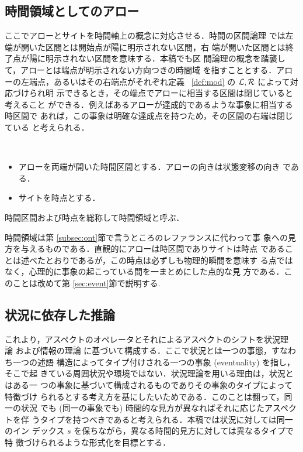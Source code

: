 \subsection{時間領域としてのアロー}\label{subsec:ato}


ここでアローとサイトを時間軸上の概念に対応させる．時間の区間論理 
\cite{Dowty79} では左端が開いた区間とは開始点が陽に明示されない区間，右
端が開いた区間とは終了点が陽に明示されない区間を意味する．本稿でも区
間論理の概念を踏襲して，アローとは端点が明示されない方向つきの時間域
を指すこととする．アローの左端点，あるいはその右端点がそれぞれ定義~
\ref{def:mod} の ${\cal L}, {\cal R}$ によって対応づけられ明
示できるとき，その端点でアローに相当する区間は閉じていると考えること
ができる．例えばあるアローが達成的であるような事象に相当する時区間で
あれば，この事象は明確な達成点を持つため，その区間の右端は閉じている
と考えられる．

\begin{my-spec}[時間領域]\label{spec:dir}~
\begin{itemize}
\item アローを両端が開いた時間区間とする．アローの向きは状態変移の向き
である．
\item サイトを時点とする．
\end{itemize}
時間区間および時点を総称して時間領域と呼ぶ．
\end{my-spec}
時間領域は第 \ref{subsec:ont}節で言うところのレファランスに代わって事
象への見方を与えるものである．直観的にアローは時区間でありサイトは時点
であることは述べたとおりであるが，この時点は必ずしも物理的瞬間を意味す
る点ではなく，心理的に事象の起こっている間を一まとめにした点的な見
方である．このことは改めて第 \ref{sec:event}節で説明する.

\subsection{状況に依存した推論}\label{sec:situated}

これより，アスペクトのオペレータとそれによるアスペクトのシフトを状況理
論 \cite{Barwise89,Devlin91} および情報の理論 \cite{Barwise97}
 に基づいて構成する．ここで状況とは一つの事態，すなわち一つの述語
構造によってタイプ付けされる一つの事象 (eventuality) を指し，そこで起
きている周囲状況や環境ではない．状況理論を用いる理由は，状況とはある一
つの事象に基づいて構成されるものでありその事象のタイプによって特徴づけ
られるとする考え方を基にしたいためである．このことは翻って，同一の状況
でも (同一の事象でも) 時間的な見方が異なればそれに応じたアスペクトを伴
うタイプを持つべきであると考えられる．本稿では状況に対しては同一のイン
デックス $s$ を保ちながら，異なる時間的見方に対しては異なるタイプで特
徴づけられるような形式化を目標とする．

